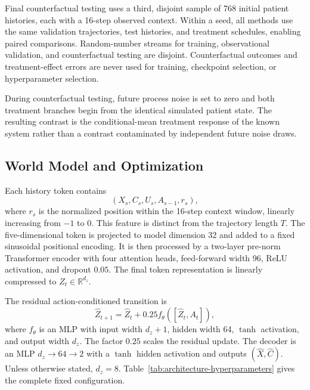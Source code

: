 Final counterfactual testing uses a third, disjoint sample of 768 initial
patient histories, each with a 16-step observed context. Within a seed,
all methods use the same validation trajectories, test histories, and
treatment schedules, enabling paired comparisons. Random-number streams
for training, observational validation, and counterfactual testing are
disjoint. Counterfactual outcomes and treatment-effect errors are never
used for training, checkpoint selection, or hyperparameter selection.

During counterfactual testing, future process noise is set to zero and
both treatment branches begin from the identical simulated patient state.
The resulting contrast is the conditional-mean treatment response of the
known system rather than a contrast contaminated by independent future
noise draws.

\subsection{World Model and Optimization}
\label{app:model-details}

Each history token contains
\begin{equation}
    (X_s,C_s,U_s,A_{s-1},r_s),
\end{equation}
where $r_s$ is the normalized position within the 16-step context window,
linearly increasing from $-1$ to $0$. This feature is distinct from the
trajectory length $T$. The five-dimensional token is projected to model
dimension 32 and added to a fixed sinusoidal positional encoding. It is
then processed by a two-layer pre-norm Transformer encoder with four
attention heads, feed-forward width 96, ReLU activation, and dropout
$0.05$. The final token representation is linearly compressed to
$Z_t\in\mathbb R^{d_z}$.

The residual action-conditioned transition is
\begin{equation}
    \widehat Z_{t+1}
    =\widehat Z_t
    +0.25f_\theta([\widehat Z_t,A_t]),
\end{equation}
where $f_\theta$ is an MLP with input width $d_z+1$, hidden width 64,
$\tanh$ activation, and output width $d_z$. The factor $0.25$ scales the
residual update. The decoder is an MLP
$d_z\rightarrow64\rightarrow2$ with a $\tanh$ hidden activation and
outputs $(\widehat X,\widehat C)$. Unless otherwise stated, $d_z=8$.
Table~\ref{tab:architecture-hyperparameters} gives the complete fixed
configuration.

